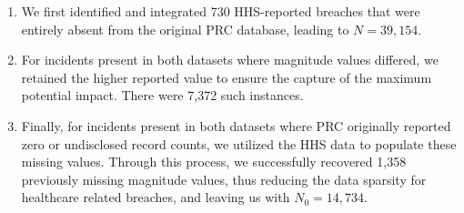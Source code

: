 \begin{enumerate}[label=(\alph*)]
    \item We first identified and integrated 730 HHS-reported breaches that were entirely absent from the original PRC database, leading to $N = 39,154$. 
    \item For incidents present in both datasets where magnitude values differed, we retained the higher reported value to ensure the capture of the maximum potential impact. There were 7,372 such instances.
    \item Finally, for incidents present in both datasets where PRC originally reported zero or undisclosed record counts, we utilized the HHS data to populate these missing values. Through this process, we successfully recovered 1,358 previously missing magnitude values, thus reducing the data sparsity for healthcare related breaches, and leaving us with $N_0 = 14,734$. 
\end{enumerate}




